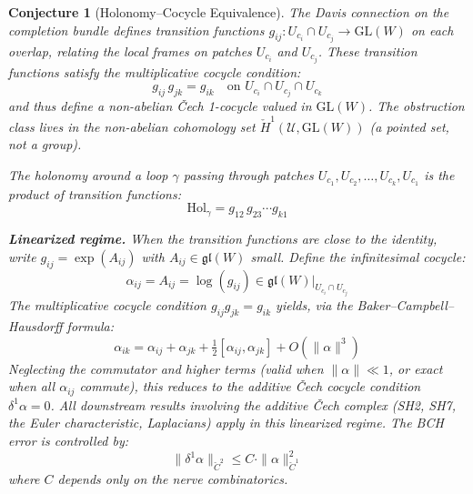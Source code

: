 \documentclass[11pt,letterpaper]{article}
\newtheorem{conjecture}{Conjecture}[section]
\newcommand{\Hol}{\mathrm{Hol}}
\newcommand{\Cech}{\check{C}}
\newcommand{\Hcech}{\check{H}}
\newcommand{\cover}{\mathcal{U}}
\begin{document}
\begin{conjecture}[Holonomy--Cocycle 
Equivalence]\label{conj:holonomy_cocycle}
The Davis connection on the completion bundle defines \emph{transition 
functions} $g_{ij} : U_{c_i} \cap U_{c_j} \to \mathrm{GL}(W)$ on each 
overlap, relating the local frames on patches $U_{c_i}$ and $U_{c_j}$. 
These transition functions satisfy the \emph{multiplicative cocycle 
condition}:
\begin{equation}\label{eq:mult_cocycle}
    g_{ij} \, g_{jk} = g_{ik} \quad \text{on } 
    U_{c_i} \cap U_{c_j} \cap U_{c_k}
\end{equation}
and thus define a \emph{non-abelian} \v{C}ech 1-cocycle valued in 
$\mathrm{GL}(W)$. The obstruction class lives in the non-abelian 
cohomology set $\Hcech^1(\cover, \mathrm{GL}(W))$ (a pointed set, 
not a group).

The holonomy around a loop $\gamma$ passing through patches 
$U_{c_1}, U_{c_2}, \ldots, U_{c_k}, U_{c_1}$ is the product of 
transition functions:
\begin{equation}\label{eq:hol_product}
    \Hol_\gamma = g_{12} \, g_{23} \cdots g_{k1}
\end{equation}

\textbf{Linearized regime.} When the transition functions are close 
to the identity, write $g_{ij} = \exp(A_{ij})$ with $A_{ij} \in 
\mathfrak{gl}(W)$ small. Define the \emph{infinitesimal cocycle}:
\begin{equation}\label{eq:hol_cocycle}
    \alpha_{ij} = A_{ij} = \log(g_{ij}) \in 
    \mathfrak{gl}(W)|_{U_{c_i} \cap U_{c_j}}
\end{equation}
The multiplicative cocycle condition 
$g_{ij} g_{jk} = g_{ik}$ yields, via the Baker--Campbell--Hausdorff 
formula:
\begin{equation}\label{eq:linearized_cocycle}
    \alpha_{ik} = \alpha_{ij} + \alpha_{jk} 
    + \tfrac{1}{2}[\alpha_{ij}, \alpha_{jk}] + O(\|\alpha\|^3)
\end{equation}
Neglecting the commutator and higher terms (valid when 
$\|\alpha\| \ll 1$, or exact when all $\alpha_{ij}$ commute), 
this reduces to the additive \v{C}ech cocycle condition 
$\delta^1 \alpha = 0$. All downstream results involving 
the additive \v{C}ech complex (SH2, SH7, the Euler characteristic, 
Laplacians) apply in this linearized regime. The BCH error is 
controlled by:
\begin{equation}\label{eq:quadratic_error}
    \|\delta^1 \alpha\|_{\Cech^2} \leq 
    C \cdot \|\alpha\|_{\Cech^1}^2
\end{equation}
where $C$ depends only on the nerve combinatorics. 


\end{conjecture}
\end{document}
